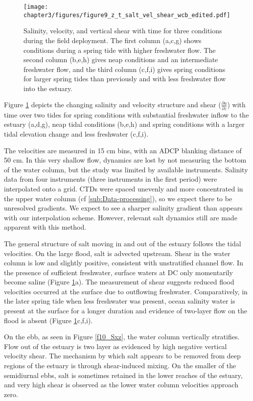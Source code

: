 \begin{figure}
\texttt{[image: chapter3/figures/figure9\_z\_t\_salt\_vel\_shear\_wcb\_edited.pdf]}
\protect\caption{Salinity, velocity, and vertical shear with time for three conditions
during the field deployment. The first column (a,c,g) shows conditions
during a spring tide with higher freshwater flow. The second column
(b,e,h) gives neap conditions and an intermediate freshwater flow,
and the third column (c,f,i) gives spring conditions for larger spring
tides than previously and with less freshwater flow into the estuary.
\label{f11_SUtz}}
\end{figure}



Figure \ref{f11_SUtz} depicts the changing salinity and velocity
structure and shear ($\frac{\partial u}{\partial z}$) with time over
two tides for spring conditions with substantial freshwater inflow
to the estuary (a,d,g), neap tidal conditions (b,e,h) and spring conditions
with a larger tidal elevation change and less freshwater (c,f,i). 

The velocities are measured in 15 cm bins, with an ADCP blanking distance
of 50 cm. In this very shallow flow, dynamics are lost by not measuring
the bottom of the water column, but the study was limited by available
instruments. Salinity data from four instruments (three instruments
in the first period) were interpolated onto a grid. CTDs were spaced
unevenly and more concentrated in the upper water column (cf \ref{sub:Data-processing}),
so we expect there to be unresolved gradients. We expect to see a
sharper salinity gradient than appears with our interpolation scheme.
However, relevant salt dynamics still are made apparent with this
method. 

The general structure of salt moving in and out of the estuary follows
the tidal velocities. On the large flood, salt is advected upstream.
Shear in the water column is low and slightly positive, consistent
with unstratified channel flow. In the presence of sufficient freshwater,
surface waters at DC only momentarily become saline (Figure \ref{f11_SUtz}a).
The measurement of shear suggests reduced flood velocities occurred
at the surface due to outflowing freshwater. Comparatively, in the
later spring tide when less freshwater was present, ocean salinity
water is present at the surface for a longer duration and evidence
of two-layer flow on the flood is absent (Figure \ref{f11_SUtz}c,f,i). 

On the ebb, as seen in Figure \ref{f10_Sxz}, the water column vertically
stratifies. Flow out of the estuary is two layer as evidenced by high
negative vertical velocity shear. The mechanism by which salt appears
to be removed from deep regions of the estuary is through shear-induced
mixing. On the smaller of the semidiurnal ebbs, salt is sometimes
retained in the lower reaches of the estuary, and very high shear
is observed as the lower water column velocities approach zero. 

